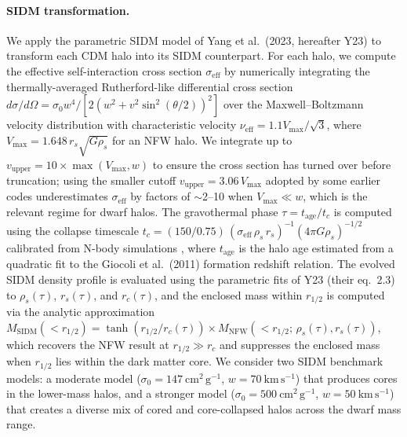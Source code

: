 \paragraph{SIDM transformation.}
We apply the parametric SIDM model of Yang et al.\ (2023, hereafter Y23) to transform
each CDM halo into its SIDM counterpart.
For each halo, we compute the effective self-interaction cross section
$\sigma_\mathrm{eff}$ by numerically integrating the thermally-averaged Rutherford-like
differential cross section
$d\sigma/d\Omega = \sigma_0 w^4 / [2(w^2 + v^2\sin^2(\theta/2))^2]$
over the Maxwell--Boltzmann velocity distribution with characteristic velocity
$\nu_\mathrm{eff} = 1.1 V_\mathrm{max} / \sqrt{3}$,
where $V_\mathrm{max} = 1.648\,r_s\sqrt{G\rho_s}$ for an NFW halo.
We integrate up to $v_\mathrm{upper} = 10 \times \max(V_\mathrm{max}, w)$ to ensure
the cross section has turned over before truncation; using the smaller cutoff
$v_\mathrm{upper} = 3.06\,V_\mathrm{max}$ adopted by some earlier codes
underestimates $\sigma_\mathrm{eff}$ by factors of $\sim$2--10 when $V_\mathrm{max} \ll w$,
which is the relevant regime for dwarf halos.
The gravothermal phase $\tau = t_\mathrm{age}/t_c$ is computed using the collapse
timescale $t_c = (150/0.75)\,(\sigma_\mathrm{eff}\,\rho_s\,r_s)^{-1}(4\pi G\rho_s)^{-1/2}$
calibrated from N-body simulations \citep{Yang2023}, where $t_\mathrm{age}$ is the halo
age estimated from a quadratic fit to the Giocoli et al.\ (2011) formation redshift
relation.
The evolved SIDM density profile is evaluated using the parametric fits of Y23
(their eq.~2.3) to $\rho_s(\tau)$, $r_s(\tau)$, and $r_c(\tau)$, and the enclosed
mass within $r_{1/2}$ is computed via the analytic approximation
$M_\mathrm{SIDM}(<r_{1/2}) = \tanh(r_{1/2}/r_c(\tau)) \times M_\mathrm{NFW}(<r_{1/2};\,
\rho_s(\tau), r_s(\tau))$, which recovers the NFW result at $r_{1/2} \gg r_c$
and suppresses the enclosed mass when $r_{1/2}$ lies within the dark matter core.
We consider two SIDM benchmark models: a moderate model
($\sigma_0 = 147~\mathrm{cm^2\,g^{-1}}$, $w = 70~\mathrm{km\,s^{-1}}$) that produces
cores in the lower-mass halos, and a stronger model
($\sigma_0 = 500~\mathrm{cm^2\,g^{-1}}$, $w = 50~\mathrm{km\,s^{-1}}$) that creates
a diverse mix of cored and core-collapsed halos across the dwarf mass range.

